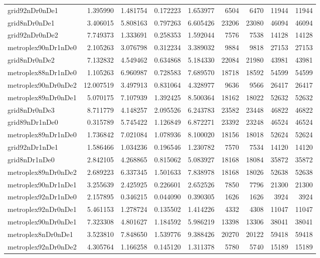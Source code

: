 \begin{longtable}{|l|r|r|r|r|r|r|r|r|}
grid92nDr0nDe1 & 1.395990 & 1.481754 & 0.172223 & 1.653977 & 6504 & 6470 & 11944 & 11944 \\
grid8nDr0nDe1 & 3.406015 & 5.808163 & 0.797263 & 6.605426 & 23206 & 23080 & 46094 & 46094 \\
grid92nDr0nDe2 & 7.749373 & 1.333691 & 0.258353 & 1.592044 & 7576 & 7538 & 14128 & 14128 \\
metroplex90nDr1nDe0 & 2.105263 & 3.076798 & 0.312234 & 3.389032 & 9884 & 9818 & 27153 & 27153 \\
grid8nDr0nDe2 & 7.132832 & 4.549462 & 0.634868 & 5.184330 & 22084 & 21980 & 43981 & 43981 \\
metroplex88nDr1nDe0 & 1.105263 & 6.960987 & 0.728583 & 7.689570 & 18718 & 18592 & 54599 & 54599 \\
metroplex90nDr0nDe2 & 12.007519 & 3.497913 & 0.831064 & 4.328977 & 9636 & 9566 & 26417 & 26417 \\
metroplex89nDr0nDe1 & 5.070175 & 7.107939 & 1.392425 & 8.500364 & 18162 & 18022 & 52632 & 52632 \\
grid8nDr0nDe3 & 8.711779 & 4.148257 & 2.095526 & 6.243783 & 23582 & 23448 & 46822 & 46822 \\
grid89nDr1nDe0 & 0.315789 & 5.745422 & 1.126849 & 6.872271 & 23392 & 23248 & 46524 & 46524 \\
metroplex89nDr1nDe0 & 1.736842 & 7.021084 & 1.078936 & 8.100020 & 18156 & 18018 & 52624 & 52624 \\
grid92nDr1nDe1 & 1.586466 & 1.034236 & 0.196546 & 1.230782 & 7570 & 7534 & 14120 & 14120 \\
grid8nDr1nDe0 & 2.842105 & 4.268865 & 0.815062 & 5.083927 & 18168 & 18084 & 35872 & 35872 \\
metroplex89nDr0nDe2 & 2.689223 & 6.337345 & 1.501633 & 7.838978 & 18168 & 18026 & 52638 & 52638 \\
metroplex90nDr1nDe1 & 3.255639 & 2.425925 & 0.226601 & 2.652526 & 7850 & 7796 & 21300 & 21300 \\
metroplex92nDr1nDe0 & 2.157895 & 0.346215 & 0.044090 & 0.390305 & 1626 & 1626 & 3924 & 3924 \\
metroplex92nDr0nDe1 & 5.461153 & 1.278724 & 0.135502 & 1.414226 & 4332 & 4308 & 11047 & 11047 \\
metroplex90nDr0nDe1 & 7.323308 & 4.801627 & 1.184592 & 5.986219 & 13398 & 13306 & 38041 & 38041 \\
metroplex8nDr0nDe1 & 3.523810 & 7.848650 & 1.539776 & 9.388426 & 20270 & 20122 & 59418 & 59418 \\
metroplex92nDr0nDe2 & 4.305764 & 1.166258 & 0.145120 & 1.311378 & 5780 & 5740 & 15189 & 15189 \\

\end{longtable}
